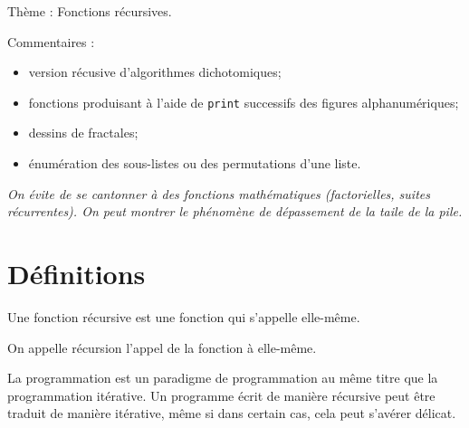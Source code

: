 \fichetrue
\proftrue
\tdfalse
\coursfalse

\def\xxnumchapitre{Semestre 1 \vspace{.2cm}}
\def\xxchapitre{\hspace{.12cm} Thèmes d'étude 6 -- Fontions récursives}
\def\xxYCartouche{-2.25cm}
\def\xxposongletx{2}
\def\xxposonglettext{1.45}
\def\xxposonglety{19}%

\def\xxonglet{\textsf{S1 -- Ch. 6}}

\def\xxactivite{Fiche}


\def\xxpied{%
Fonctions récursives-- \xxactivite%
}

\setcounter{secnumdepth}{5}


%
%
\vspace{1.5cm}
\pagestyle{fancy}
\thispagestyle{plain}
\setcounter{section}{0}



Thème : Fonctions récursives.
 
Commentaires :
\begin{itemize}
\item version récusive d'algorithmes dichotomiques;
\item fonctions produisant à l'aide de \texttt{print} successifs des figures alphanumériques;
\item dessins de fractales;
\item énumération des sous-listes ou des permutations d'une liste.
\end{itemize}
\textit{On évite de se cantonner à des fonctions mathématiques (factorielles, suites récurrentes). On peut montrer le phénomène de dépassement de la taile de la pile.}


\section{Définitions}
\begin{defi}%
Une fonction récursive est une fonction qui s'appelle elle-même.

On appelle récursion l'appel de la fonction à elle-même.
\end{defi}

La programmation est un paradigme de programmation au même titre que la programmation itérative. Un programme écrit de manière récursive peut être traduit de manière itérative, même si dans certain cas, cela peut s'avérer délicat.


